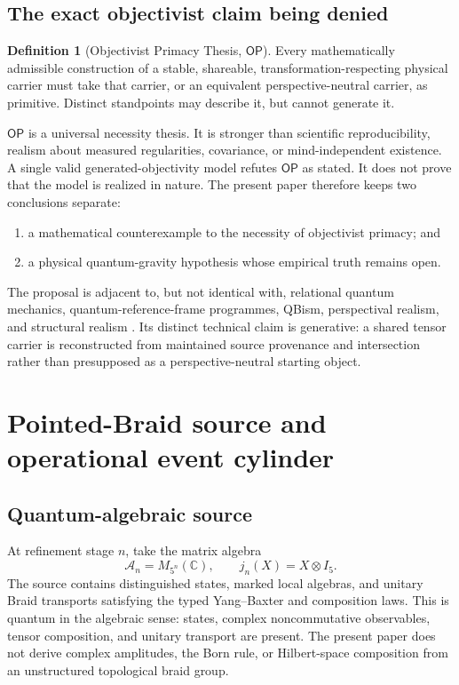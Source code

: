 \documentclass[11pt]{article}
\theoremstyle{definition}
\newtheorem{definition}[theorem]{Definition}
\theoremstyle{remark}
\newcommand{\cA}{\mathcal{A}}
\newcommand{\OPT}{\mathsf{OP}}
\begin{document}
\subsection{The exact objectivist claim being denied}

\begin{definition}[Objectivist Primacy Thesis, $\OPT$]
Every mathematically admissible construction of a stable, shareable, transformation-respecting physical carrier must take that carrier, or an equivalent perspective-neutral carrier, as primitive. Distinct standpoints may describe it, but cannot generate it.
\end{definition}

$\OPT$ is a universal necessity thesis. It is stronger than scientific reproducibility, realism about measured regularities, covariance, or mind-independent existence. A single valid generated-objectivity model refutes $\OPT$ as stated. It does not prove that the model is realized in nature. The present paper therefore keeps two conclusions separate:
\begin{enumerate}
\item a mathematical counterexample to the necessity of objectivist primacy; and
\item a physical quantum-gravity hypothesis whose empirical truth remains open.
\end{enumerate}

The proposal is adjacent to, but not identical with, relational quantum mechanics, quantum-reference-frame programmes, QBism, perspectival realism, and structural realism \cite{rovelli1996,giacomini2019,vanrietvelde2020,fuchs2013,massimi2022,ladyman1998,weyl1952}. Its distinct technical claim is generative: a shared tensor carrier is reconstructed from maintained source provenance and intersection rather than presupposed as a perspective-neutral starting object.

\section{Pointed-Braid source and operational event cylinder}

\subsection{Quantum-algebraic source}

At refinement stage $n$, take the matrix algebra
\begin{equation}
 \cA_n=M_{5^n}(\mathbb C),\qquad
 j_n(X)=X\otimes I_5.
\end{equation}
The source contains distinguished states, marked local algebras, and unitary Braid transports satisfying the typed Yang--Baxter and composition laws. This is quantum in the algebraic sense: states, complex noncommutative observables, tensor composition, and unitary transport are present. The present paper does not derive complex amplitudes, the Born rule, or Hilbert-space composition from an unstructured topological braid group.
\end{document}
